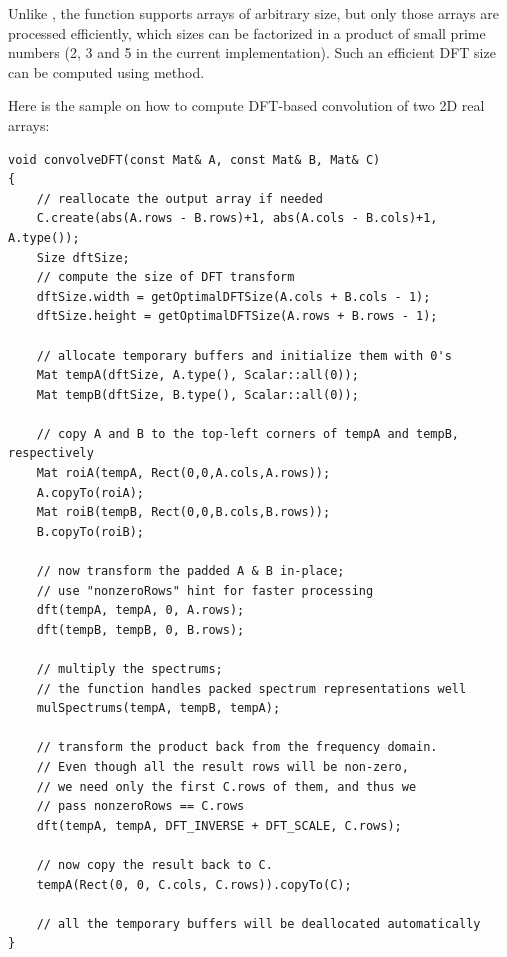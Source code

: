 Unlike , the function supports arrays of arbitrary size, but only those arrays are processed efficiently, which sizes can be factorized in a product of small prime numbers (2, 3 and 5 in the current implementation). Such an efficient DFT size can be computed using  method.

Here is the sample on how to compute DFT-based convolution of two 2D real arrays:
\begin{lstlisting}
void convolveDFT(const Mat& A, const Mat& B, Mat& C)
{
    // reallocate the output array if needed
    C.create(abs(A.rows - B.rows)+1, abs(A.cols - B.cols)+1, A.type());
    Size dftSize;
    // compute the size of DFT transform
    dftSize.width = getOptimalDFTSize(A.cols + B.cols - 1);
    dftSize.height = getOptimalDFTSize(A.rows + B.rows - 1);
    
    // allocate temporary buffers and initialize them with 0's
    Mat tempA(dftSize, A.type(), Scalar::all(0));
    Mat tempB(dftSize, B.type(), Scalar::all(0));
    
    // copy A and B to the top-left corners of tempA and tempB, respectively
    Mat roiA(tempA, Rect(0,0,A.cols,A.rows));
    A.copyTo(roiA);
    Mat roiB(tempB, Rect(0,0,B.cols,B.rows));
    B.copyTo(roiB);
    
    // now transform the padded A & B in-place;
    // use "nonzeroRows" hint for faster processing
    dft(tempA, tempA, 0, A.rows);
    dft(tempB, tempB, 0, B.rows);
    
    // multiply the spectrums;
    // the function handles packed spectrum representations well
    mulSpectrums(tempA, tempB, tempA);
    
    // transform the product back from the frequency domain.
    // Even though all the result rows will be non-zero,
    // we need only the first C.rows of them, and thus we
    // pass nonzeroRows == C.rows
    dft(tempA, tempA, DFT_INVERSE + DFT_SCALE, C.rows);
    
    // now copy the result back to C.
    tempA(Rect(0, 0, C.cols, C.rows)).copyTo(C);
    
    // all the temporary buffers will be deallocated automatically
}
\end{lstlisting}

